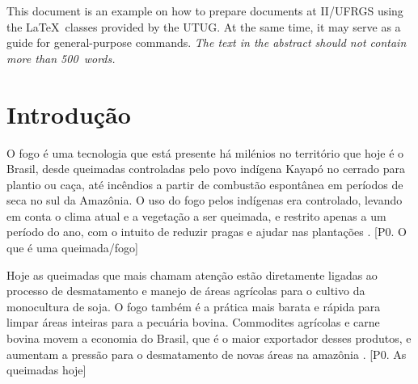 \documentclass[cic,tc]{iiufrgs}
\begin{document}
\listoffigures

\listoftables

\begin{abstract}
Este documento é um exemplo de como formatar documentos para o
Instituto de Informática da UFRGS usando as classes \LaTeX\
disponibilizadas pelo UTUG\@. Ao mesmo tempo, pode servir de consulta
para comandos mais genéricos. \emph{O texto do resumo não deve
conter mais do que 500 palavras.}
\end{abstract}

\begin{translatedabstract}
This document is an example on how to prepare documents at II/UFRGS
using the \LaTeX\ classes provided by the UTUG\@. At the same time, it
may serve as a guide for general-purpose commands. \emph{The text in
the abstract should not contain more than 500~words.}
\end{translatedabstract}



\chapter{Introdução}

O fogo é uma tecnologia que está presente há milénios no território que hoje é o 
Brasil, desde queimadas controladas pelo povo indígena Kayapó no cerrado para 
plantio ou caça, até incêndios a partir de combustão espontânea em períodos de seca 
no sul da Amazônia. O uso do fogo pelos indígenas era controlado, levando em conta 
o clima atual e a vegetação a ser queimada, e restrito apenas 
a um período do ano, com o intuito de reduzir pragas e ajudar nas plantações 
\citep{leonel_2000}. [P0. O que é uma queimada/fogo] \par

Hoje as queimadas que mais chamam atenção estão diretamente ligadas ao processo de 
desmatamento e manejo de áreas agrícolas para o cultivo da monocultura de soja. O 
fogo também é a prática mais barata e rápida para limpar áreas inteiras para a 
pecuária bovina. Commodites agrícolas e carne bovina movem a economia do Brasil, 
que é o maior exportador desses produtos, e aumentam a pressão para o 
desmatamento de novas áreas na amazônia \citep{fuchs_2020}. 
[P0. As queimadas hoje] \par
\end{document}
